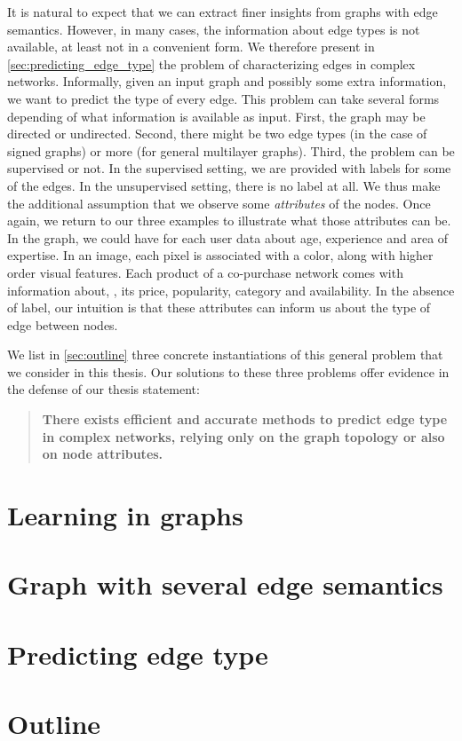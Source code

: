 \medskip

It is natural to expect that we can extract finer insights from graphs with edge semantics. However,
in many cases, the information about edge types is not available, at least not in a convenient form.
We therefore present in
\autoref{sec:predicting_edge_type} the problem of characterizing edges in complex networks.
Informally, given an input graph and possibly some extra information, we want to predict the type of
every edge. This problem can take several forms depending of what information is available as input.
First, the graph may be directed or undirected. Second, there might be two edge types (in the case of
signed graphs) or more (for general multilayer graphs). Third, the problem can be supervised or not.
In the supervised setting, we are provided with labels for some of the edges. In the unsupervised
setting, there is no label at all. We thus make the additional assumption that we observe some
\emph{attributes} of the nodes. Once again, we return to our three examples to illustrate what
those attributes can be. In the \wik{} graph, we could have for each user data about age, experience and
area of expertise. In an image, each pixel is associated with a color, along with higher order
visual features. Each product of a co-purchase network comes with information about, \eg{}, its price,
popularity, category and availability. In the absence of label, our intuition is that these
attributes can inform us about the type of edge between nodes. 

\medskip

We list in \autoref{sec:outline} three concrete instantiations of this general problem that we
consider in this thesis. Our solutions to these three problems offer evidence in the defense of our
thesis statement:
\begin{quote}
\bf
There exists efficient and accurate methods to predict edge type in complex networks, relying
only on the graph topology or also on node attributes.
\end{quote}

\section{Learning in graphs}
\label{sec:learning_in_graphs}


\section{Graph with several edge semantics}
\label{sec:edge_semantics}


\section{Predicting edge type}
\label{sec:predicting_edge_type}


\section{Outline}
\label{sec:outline}

